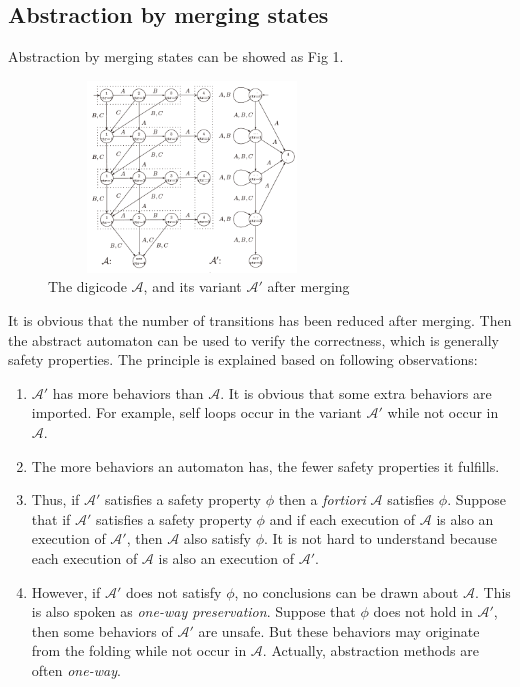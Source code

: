 \documentclass{acmtog} %
\begin{document}
    \subsection{Abstraction by merging states}
        \quad Abstraction by merging states can be showed as Fig 1.
        \begin{figure}[H]
          \centering
          \includegraphics[width=3.0in, height=2.0in]{1.png}
          \caption{The digicode $\mathcal{A}$, and its variant $\mathcal{A}'$ after merging}
        \end{figure}
        It is obvious that the number of transitions has been reduced after merging. Then the abstract automaton can be used to verify the correctness, which is generally safety properties. The principle is explained based on following observations:
        \begin{enumerate}
          \item $\mathcal{A}'$ has more behaviors than $\mathcal{A}$. It is obvious that some extra behaviors are imported. For example, self loops occur in the variant $\mathcal{A}'$ while not occur in $\mathcal{A}$.
          \item The more behaviors an automaton has, the fewer safety properties it fulfills.
          \item Thus, if $\mathcal{A}'$ satisfies a safety property $\phi$ then a \textit{fortiori} $\mathcal{A}$ satisfies $\phi$. Suppose that if $\mathcal{A}'$ satisfies a safety property $\phi$ and if each execution of $\mathcal{A}$ is also an execution of $\mathcal{A}'$, then $\mathcal{A}$ also satisfy $\phi$. It is not hard to understand because each execution of $\mathcal{A}$ is also an execution of $\mathcal{A}'$.
          \item However, if $\mathcal{A}'$ does not satisfy $\phi$, no conclusions can be drawn about $\mathcal{A}$. This is also spoken as \textit{one-way preservation}. Suppose that $\phi$ does not hold in $\mathcal{A}'$, then some behaviors of $\mathcal{A}'$ are unsafe. But these behaviors may originate from the folding while not occur in $\mathcal{A}$. Actually, abstraction methods are often \textit{one-way}.
        \end{enumerate}
\end{document}
